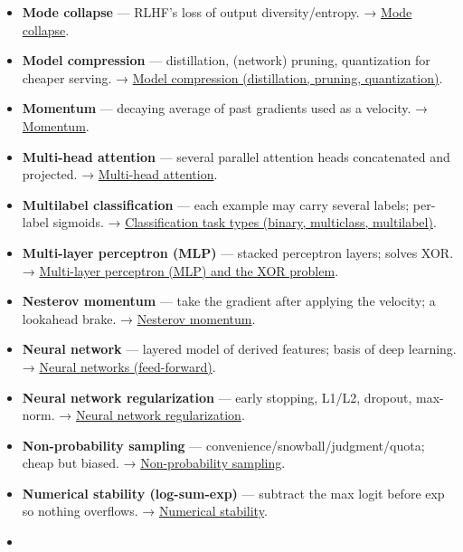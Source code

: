 \documentclass[
  10pt,
  letterpaper,
  onecolumn]{article}
\begin{document}
\begin{itemize}
  values. → \protect\hyperlink{handling-missing-data}{Handling missing
  data}.
\item
  \textbf{Mode collapse} --- RLHF's loss of output diversity/entropy. →
  \protect\hyperlink{mode-collapse}{Mode collapse}.
\item
  \textbf{Model compression} --- distillation, (network) pruning,
  quantization for cheaper serving. →
  \protect\hyperlink{model-compression-distillation-pruning-quantization}{Model
  compression (distillation, pruning, quantization)}.
\item
  \textbf{Momentum} --- decaying average of past gradients used as a
  velocity. → \protect\hyperlink{momentum}{Momentum}.
\item
  \textbf{Multi-head attention} --- several parallel attention heads
  concatenated and projected. →
  \protect\hyperlink{multi-head-attention}{Multi-head attention}.
\item
  \textbf{Multilabel classification} --- each example may carry several
  labels; per-label sigmoids. →
  \protect\hyperlink{classification-task-types-binary-multiclass-multilabel}{Classification
  task types (binary, multiclass, multilabel)}.
\item
  \textbf{Multi-layer perceptron (MLP)} --- stacked perceptron layers;
  solves XOR. →
  \protect\hyperlink{multi-layer-perceptron-mlp-and-the-xor-problem}{Multi-layer
  perceptron (MLP) and the XOR problem}.
\item
  \textbf{Nesterov momentum} --- take the gradient after applying the
  velocity; a lookahead brake. →
  \protect\hyperlink{nesterov-momentum}{Nesterov momentum}.
\item
  \textbf{Neural network} --- layered model of derived features; basis
  of deep learning. →
  \protect\hyperlink{neural-networks-feed-forward}{Neural networks
  (feed-forward)}.
\item
  \textbf{Neural network regularization} --- early stopping, L1/L2,
  dropout, max-norm. →
  \protect\hyperlink{neural-network-regularization}{Neural network
  regularization}.
\item
  \textbf{Non-probability sampling} ---
  convenience/snowball/judgment/quota; cheap but biased. →
  \protect\hyperlink{non-probability-sampling}{Non-probability
  sampling}.
\item
  \textbf{Numerical stability (log-sum-exp)} --- subtract the max logit
  before exp so nothing overflows. →
  \protect\hyperlink{numerical-stability}{Numerical stability}.
\item

\end{itemize}
\end{document}
